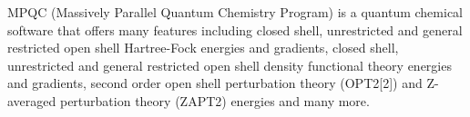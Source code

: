 MPQC (Massively Parallel Quantum Chemistry Program) is a quantum chemical software that offers many features including closed shell, unrestricted and general restricted open shell Hartree-Fock energies and gradients, closed shell, unrestricted and general restricted open shell density functional theory energies and gradients, second order open shell perturbation theory (OPT2[2]) and Z-averaged perturbation theory (ZAPT2) energies and many more.
